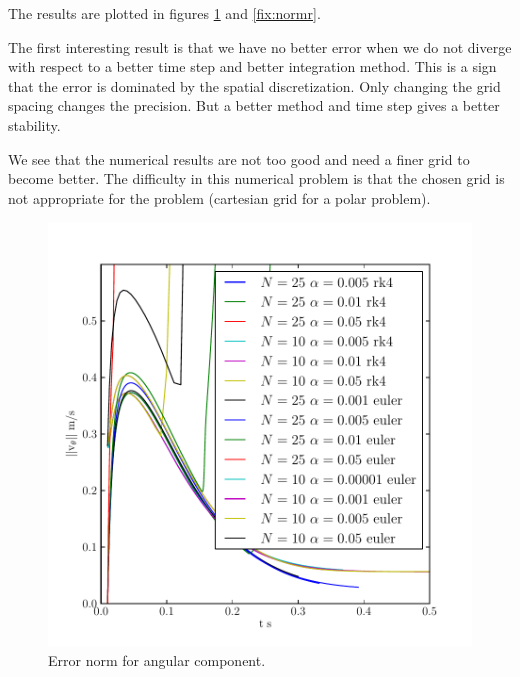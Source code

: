 The results are plotted in figures \ref{fix:normtheta} and \ref{fix:normr}.

The first interesting result is that we have no better error when we do not diverge with respect to a better time step and better integration method.
This is a sign that the error is dominated by the spatial discretization.
Only changing the grid spacing changes the precision.
But a better method and time step gives a better stability.

We see that the numerical results are not too good and need a finer grid to become better.
The difficulty in this numerical problem is that the chosen grid is not appropriate for the problem 
(cartesian grid for a polar problem).


\begin{figure}
\begin{center}
\includegraphics{fixed/normtheta.pdf}
\end{center}
\caption{Error norm for angular component.
}
\label{fix:normtheta}
\end{figure}

